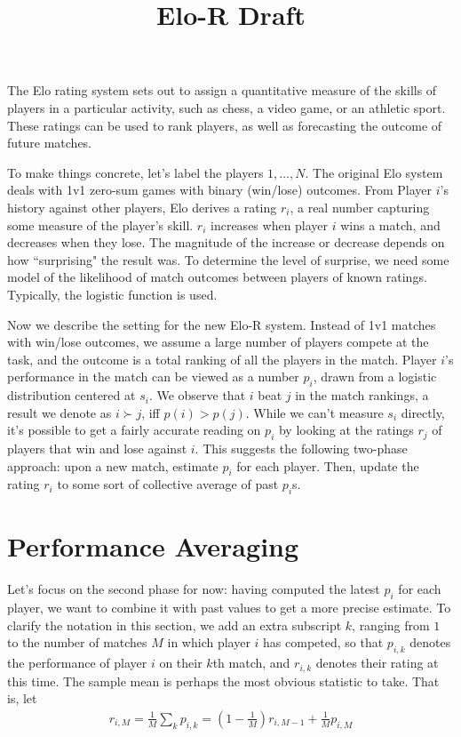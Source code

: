 \documentclass{article}
\title{Elo-R Draft}
\begin{document}
\maketitle

The Elo rating system sets out to assign a quantitative measure of the skills of players in a particular activity, such as chess, a video game, or an athletic sport. These ratings can be used to rank players, as well as forecasting the outcome of future matches.

To make things concrete, let's label the players $1,\ldots,N$. The original Elo system deals with 1v1 zero-sum games with binary (win/lose) outcomes. From Player $i$'s history against other players, Elo derives a rating $r_i$, a real number capturing some measure of the player's skill. $r_i$ increases when player $i$ wins a match, and decreases when they lose. The magnitude of the increase or decrease depends on how ``surprising" the result was. To determine the level of surprise, we need some model of the likelihood of match outcomes between players of known ratings. Typically, the logistic function is used.

Now we describe the setting for the new Elo-R system. Instead of 1v1 matches with win/lose outcomes, we assume a large number of players compete at the task, and the outcome is a total ranking of all the players in the match. Player $i$'s performance in the match can be viewed as a number $p_i$, drawn from a logistic distribution centered at $s_i$. We observe that $i$ beat $j$ in the match rankings, a result we denote as $i \succ j$, iff $p(i) > p(j)$. While we can't measure $s_i$ directly, it's possible to get a fairly accurate reading on $p_i$ by looking at the ratings $r_j$ of players that win and lose against $i$. This suggests the following two-phase approach: upon a new match, estimate $p_i$ for each player. Then, update the rating $r_i$ to some sort of collective average of past $p_i$s.

\section{Performance Averaging}

Let's focus on the second phase for now: having computed the latest $p_i$ for each player, we want to combine it with past values to get a more precise estimate. To clarify the notation in this section, we add an extra subscript $k$, ranging from $1$ to the number of matches $M$ in which player $i$ has competed, so that $p_{i,k}$ denotes the performance of player $i$ on their $k$th match, and $r_{i,k}$ denotes their rating at this time. The sample mean is perhaps the most obvious statistic to take. That is, let
\begin{align}
r_{i,M} = \frac{1}{M} \sum_k p_{i,k} = \left(1 - \frac{1}{M}\right) r_{i,M-1} +  \frac{1}{M} p_{i,M}
\end{align}
\end{document}
